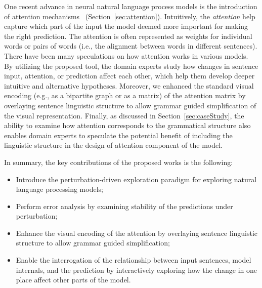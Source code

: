 One recent advance in neural natural language process models is the introduction of attention mechanisms~\cite{VaswaniShazeerParmar2017} (Section~\ref{sec:attention}). Intuitively, the \emph{attention} help capture which part of the input the model deemed more important for making the right prediction. The attention is often represented as weights for individual words or pairs of words (i.e., the alignment between words in different sentences).
%
There have been many speculations on how attention works in various models. By utilizing the proposed tool, the domain experts study how changes in sentence input, attention, or prediction affect each other, which help them develop deeper intuitive and alternative hypotheses. 
Moreover, we enhanced the standard visual encoding (e.g., as a bipartite graph or as a matrix) of the attention matrix by overlaying sentence linguistic structure to allow grammar guided simplification of the visual representation.
%
Finally, as discussed in Section~\ref{sec:caseStudy}, the ability to examine how attention corresponds to the grammatical structure also enables domain experts to speculate the potential benefit of including the linguistic structure in the design of attention component of the model.

In summary, the key contributions of the proposed works is the following:
\begin{itemize}
    \item Introduce the perturbation-driven exploration paradigm for exploring natural language processing models;

    \item Perform error analysis by examining stability of the predictions under perturbation;

    \item Enhance the visual encoding of the attention by overlaying sentence linguistic structure to allow grammar guided simplification;

    \item Enable the interrogation of the relationship between input sentences, model internals, and the prediction by interactively exploring how the change in one place affect other parts of the model.
\end{itemize}
%

